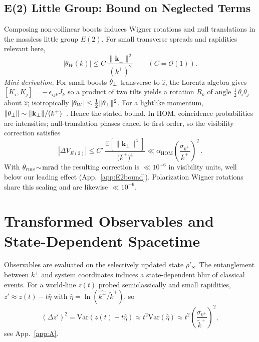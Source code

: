 \documentclass[aps,11pt]{article}
\newcommand{\Var}{\mathrm{Var}}
\newcommand{\E}{\mathbb{E}}
\newcommand{\kplus}{k^{+}}
\newcommand{\kperp}{\mathbf{k}_{\perp}}
\newcommand{\kbar}{\bar{k}^{+}}
\newcommand{\ktil}{\tilde{k}^{+}}
\newcommand{\alphahom}{\alpha_{\text{HOM}}}
\begin{document}
\subsection{E(2) Little Group: Bound on Neglected Terms}\label{sec:E2}
Composing non-collinear boosts induces Wigner rotations and null translations in the massless little group \(E(2)\). For small transverse spreads and rapidities relevant here,
\begin{equation}
|\theta_W(k)| \le C\, \frac{\|\kperp\|^{2}}{(\kplus)^{2}}\qquad (C=\mathcal O(1)).
\end{equation}
\emph{Mini-derivation.} For small boosts \(\vb{\theta}_\perp\) transverse to \(\hat z\),
the Lorentz algebra gives \([K_i,K_j]=-\,\epsilon_{ijk}J_k\) so a product of two tilts yields a rotation \(R_k\) of angle \(\tfrac12\,\theta_i\theta_j\) about \(\hat z\); isotropically \(|\theta_W|\le \tfrac12\|\vb{\theta}_\perp\|^2\). For a lightlike momentum, \(\|\vb{\theta}_\perp\|\sim \|\kperp\|/(\kplus)\)~\cite{Wigner1939,Weinberg1995}. Hence the stated bound. In HOM, coincidence probabilities are intensities; null-translation phases cancel to first order, so the visibility correction satisfies
\begin{equation}\label{eq:E2bound}
|\Delta V_{E(2)}| \le C'\, \frac{\E[\|\kperp\|^{4}]}{\big(\kbar\big)^{4}} \ll \alphahom\left(\frac{\sigma_{\kplus}}{\kbar}\right)^{2}\,.
\end{equation}
With \(\theta_{\rm rms}\!\sim\!\mathrm{mrad}\) the resulting correction is \(\ll10^{-6}\) in visibility units, well below our leading effect (App.~\ref{app:E2bound}). Polarization Wigner rotations share this scaling and are likewise \(\ll10^{-6}\).

\section{Transformed Observables and State-Dependent Spacetime}\label{sec:operators}
Observables are evaluated on the selectively updated state \(\rho'_S\). The entanglement between \(\kplus\) and system coordinates induces a state-dependent blur of classical events. For a world-line \(z(t)\) probed semiclassically and small rapidities, \(z'\approx z(t)-t\hat\eta\) with \(\hat\eta=\ln(\hat{\kplus}/\ktil)\), so
\begin{equation}\label{eq:dzvar}
(\Delta z')^{2} = \Var(z(t)-t\hat\eta)\approx t^{2}\Var(\hat\eta)\approx t^{2}\left(\frac{\sigma_{\kplus}}{\ktil}\right)^{2}\!,
\end{equation}
see App.~\ref{app:A}.
\end{document}
